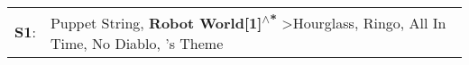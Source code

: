 \begin{supertabular}{p{0.03\textwidth}p{0.92\textwidth}}
 \textbf{S1}:  &  Puppet String\textsuperscript{}, \enspace \textbf{Robot World[1]\textsuperscript{$\wedge$*}} \textgreater \enspace Hourglass\textsuperscript{}, \enspace Ringo\textsuperscript{}, \enspace All In Time\textsuperscript{}, \enspace No Diablo\textsuperscript{}, 's Theme\textsuperscript{}  \enspace  \\
\end{supertabular}
